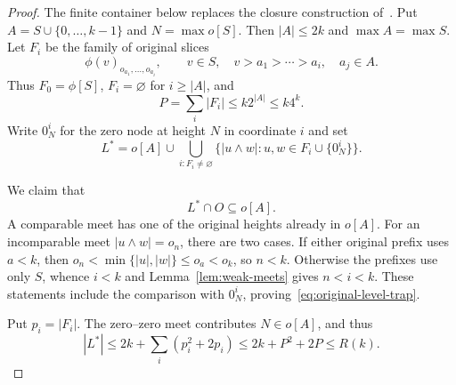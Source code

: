\documentclass{article}
\numberwithin{equation}{section}
\theoremstyle{definition}
\begin{document}
\begin{proof}
The finite container below replaces the closure construction
of~\cite[Lemma~4.4]{InfiniteLanguages}.
Put $A=S\cup\{0,\ldots,k-1\}$ and $N=\max o[S]$. Then $|A|\leq2k$
and $\max A=\max S$. Let $F_i$ be the family of original slices
\[
\phi(v)_{o_{a_1},\ldots,o_{a_i}},\qquad
v\in S,\quad v>a_1>\cdots>a_i,\quad a_j\in A.
\]
Thus $F_0=\phi[S]$, $F_i=\varnothing$ for $i\geq|A|$, and
\begin{equation}\label{eq:P}
P=\sum_i|F_i|\leq k2^{|A|}\leq k4^k.
\end{equation}
Write $0_N^i$ for the zero node at height $N$ in coordinate $i$ and set
\begin{equation}\label{eq:Lstar}
L^*=o[A]\cup\bigcup_{i:F_i\ne\varnothing}
\{|u\wedge w|:u,w\in F_i\cup\{0_N^i\}\}.
\end{equation}

We claim that
\begin{equation}\label{eq:original-level-trap}
 L^*\cap O\subseteq o[A].
\end{equation}
A comparable meet has one of the original heights already in $o[A]$.
For an incomparable meet $|u\wedge w|=o_n$, there are two cases.
If either original prefix uses $a<k$, then
$o_n<\min\{|u|,|w|\}\leq o_a<o_k$, so $n<k$.
Otherwise the prefixes use only $S$, whence $i<k$ and
Lemma~\ref{lem:weak-meets} gives $n<i<k$. These statements include the
comparison with $0_N^i$, proving~\eqref{eq:original-level-trap}.

Put $p_i=|F_i|$. The zero--zero meet contributes $N\in o[A]$, and thus
\begin{equation}\label{eq:level-count}
|L^*|\leq2k+\sum_i(p_i^2+2p_i)\leq2k+P^2+2P\leq R(k).
\end{equation}


\end{proof}
\end{document}
